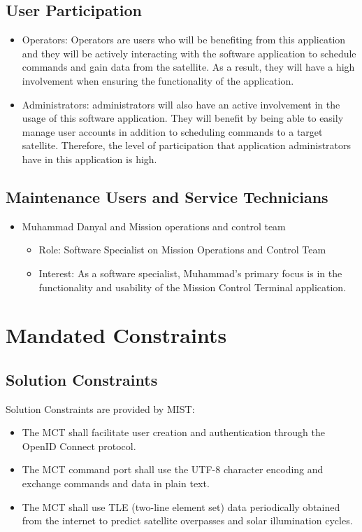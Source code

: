 \documentclass[12pt]{article}
\begin{document}
\subsection{User Participation}
\begin{itemize}
    \item Operators: Operators are users who will be benefiting from this application and they will be actively interacting with the software application to schedule commands and gain data from the satellite. As a result, they will have a high involvement when ensuring the functionality of the application.
    \item Administrators: administrators will also have an active involvement in the usage of this software application. They will benefit by being able to easily manage user accounts in addition to scheduling commands to a target satellite. Therefore, the level of participation that application administrators have in this application is high.

\end{itemize}

\subsection{Maintenance Users and Service Technicians}
\begin{itemize}
    \item Muhammad Danyal and Mission operations and control team
    \begin{itemize}
        \item Role: Software Specialist on Mission Operations and Control Team
        \item Interest: As a software specialist, Muhammad’s primary focus is in the functionality and usability of the Mission Control Terminal application.

    \end{itemize}
\end{itemize}


\section{Mandated Constraints}
\subsection{Solution Constraints}
Solution Constraints are provided by MIST:
\begin{itemize}
  \item The MCT shall facilitate user creation and authentication through the OpenID Connect protocol.
  \item The MCT command port shall use the UTF-8 character encoding and exchange commands and data in plain text.
  \item The MCT shall use TLE (two-line element set) data periodically obtained from the internet to predict satellite overpasses and solar illumination cycles.
\end{itemize}
\end{document}
